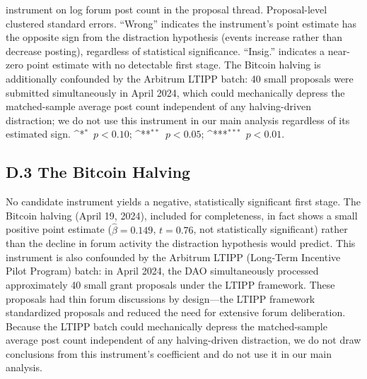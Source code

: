 \documentclass[12pt]{article}
\newcommand{\sym}[1]{\ifmmode^{#1}\else\(^{#1}\)\fi}
\begin{document}
\begin{table}[H]
\begin{singlespace}
\begin{flushleft}
instrument on log forum post count in the proposal thread. Proposal-level clustered
standard errors. ``Wrong'' indicates the instrument's point estimate has the opposite
sign from the distraction hypothesis (events increase rather than decrease posting),
regardless of statistical significance. ``Insig.''
indicates a near-zero point estimate with no detectable first stage. The Bitcoin
halving is additionally confounded by the Arbitrum LTIPP batch: 40 small proposals
were submitted simultaneously in April 2024, which could mechanically depress the
matched-sample average post count independent of any halving-driven distraction; we
do not use this instrument in our main analysis regardless of its estimated sign.
\sym{*}~$p < 0.10$; \sym{**}~$p < 0.05$; \sym{***}~$p < 0.01$.
\end{flushleft}
\end{singlespace}
\end{table}

\subsection*{D.3 The Bitcoin Halving}

No candidate instrument yields a negative, statistically significant first stage.
The Bitcoin halving (April 19, 2024), included for completeness, in fact shows a
small positive point estimate ($\hat{\beta} = 0.149$, $t = 0.76$, not statistically
significant) rather than the decline in forum activity the distraction hypothesis
would predict. This instrument is also confounded by the Arbitrum LTIPP (Long-Term
Incentive Pilot Program) batch: in April 2024, the DAO simultaneously processed
approximately 40 small grant proposals under the LTIPP framework. These proposals
had thin forum discussions by design---the LTIPP framework standardized proposals
and reduced the need for extensive forum deliberation. Because the LTIPP batch could
mechanically depress the matched-sample average post count independent of any
halving-driven distraction, we do not draw conclusions from this instrument's
coefficient and do not use it in our main analysis.
\end{document}
